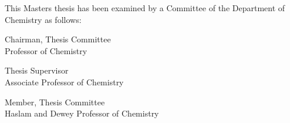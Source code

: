 %
%
%

\begin{titlepage}
\begin{large}
This Masters thesis has been examined by a Committee of the Department
of Chemistry as follows:

\signature{Professor Jianshu Cao}{Chairman, Thesis Committee \\
   Professor of Chemistry}

\signature{Professor Troy Van Voorhis}{Thesis Supervisor \\
   Associate Professor of Chemistry}

\signature{Professor Robert W. Field}{Member, Thesis Committee \\
   Haslam and Dewey Professor of Chemistry}
\end{large}
\end{titlepage}

